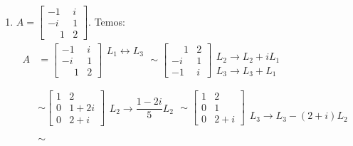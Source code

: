 \begin{exemplo}
\begin{enumerate}[label={\arabic*})]
		\item $A = \begin{bmatrix}
		-1 & i\\
		-i & 1\\
		\phantom{-}1 & 2
		\end{bmatrix}.$ Temos:
		\begin{align*}
			A &= 
				\left[
					\begin{array}{cc}
						-1 & i\\
						-i & 1\\
						\phantom{-}1 & 2
					\end{array}
				\right]
				\begin{array}{l}
					L_1 \leftrightarrow L_3\\
					\phantom{x}\\
					\phantom{x}
				\end{array} \sim
				\left[
					\begin{array}{cc}
						\phantom{-}1 & 2\\
						-i & 1\\
						-1 & i
					\end{array}
				\right]
				\begin{array}{l}
					\phantom{x}\\
					L_2 \to L_2 + iL_1\\
					L_3 \to L_3 + L_1
				\end{array}\\ \\ &\sim
				\left[
					\begin{array}{cc}
						1 & 2\\
						0 & 1 + 2i\\
						0 & 2 + i
					\end{array}
				\right]
				\begin{array}{l}
					\phantom{x}\\
					L_2 \to \dfrac{1 - 2i}{5}L_2\\
					\phantom{x}
				\end{array} \sim
				\left[
					\begin{array}{cc}
						1 & 2\\
						0 & 1\\
						0 & 2 + i
					\end{array}
				\right]
				\begin{array}{l}
					\phantom{x}\\
					\phantom{x}\\
					L_3 \to L_3 - (2 + i)L_2
				\end{array}\\ \\ &\sim

\end{align*}
\end{enumerate}
\end{exemplo}
